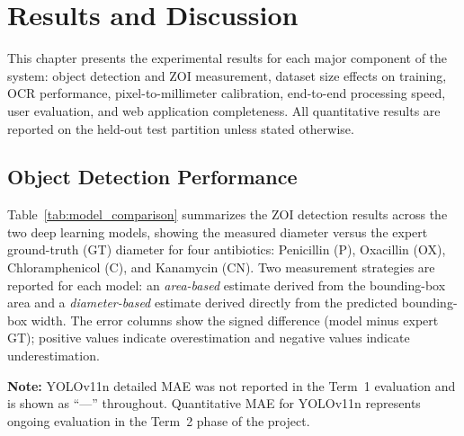 \chapter{Results and Discussion}

This chapter presents the experimental results for each major component of the system:
object detection and ZOI measurement, dataset size effects on training, OCR performance,
pixel-to-millimeter calibration, end-to-end processing speed, user evaluation,
and web application completeness.
All quantitative results are reported on the held-out test partition unless stated otherwise.

\section{Object Detection Performance}
\label{sec:detection_performance}

Table~\ref{tab:model_comparison} summarizes the ZOI detection results across the two deep learning
models, showing the measured diameter versus the expert ground-truth (GT) diameter
for four antibiotics: Penicillin (P), Oxacillin (OX), Chloramphenicol (C), and Kanamycin (CN).
Two measurement strategies are reported for each model:
an \emph{area-based} estimate derived from the bounding-box area
and a \emph{diameter-based} estimate derived directly from the predicted bounding-box width.
The error columns show the signed difference (model minus expert GT); positive values indicate
overestimation and negative values indicate underestimation.

\noindent\textbf{Note:} YOLOv11n detailed MAE was not reported in the Term~1 evaluation
and is shown as ``---'' throughout. Quantitative MAE for YOLOv11n represents ongoing
evaluation in the Term~2 phase of the project.

